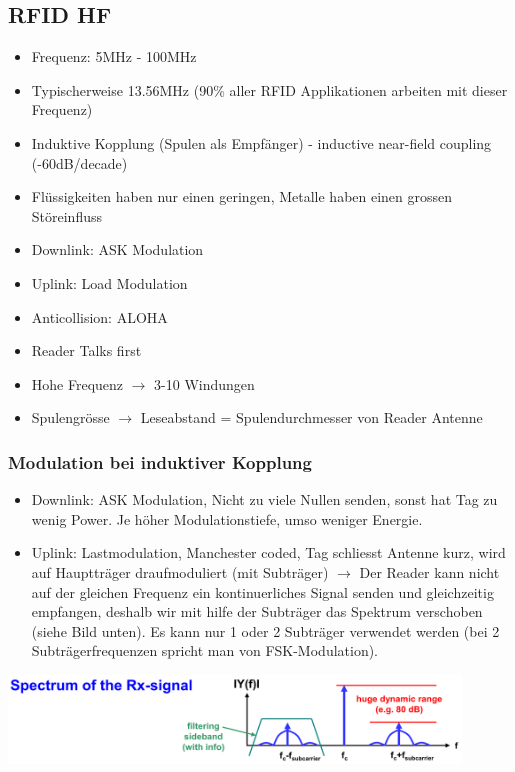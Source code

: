 \subsection{RFID HF}
	\begin{itemize}
		\item Frequenz: 5MHz - 100MHz
		\item Typischerweise 13.56MHz (90\% aller RFID Applikationen arbeiten mit dieser Frequenz)
		\item Induktive Kopplung (Spulen als Empfänger) - inductive near-field coupling (-60dB/decade)
		\item Flüssigkeiten haben nur einen geringen, Metalle haben einen grossen Störeinfluss
		\item Downlink: ASK Modulation
		\item Uplink: Load Modulation
		\item Anticollision: ALOHA
		\item Reader Talks first
		\item Hohe Frequenz $\rightarrow$ 3-10 Windungen
		\item Spulengrösse $\rightarrow$ Leseabstand = Spulendurchmesser von Reader Antenne
	\end{itemize}
\subsubsection{Modulation bei induktiver Kopplung}
	\begin{itemize}
		\item Downlink: ASK Modulation, Nicht zu viele Nullen senden, sonst hat Tag zu wenig Power. Je höher Modulationstiefe, umso weniger Energie. 
		\item Uplink: Lastmodulation, Manchester coded, Tag schliesst Antenne kurz, wird auf Hauptträger draufmoduliert (mit Subträger) $\rightarrow$
		Der Reader kann nicht auf der gleichen Frequenz ein kontinuerliches Signal senden und gleichzeitig empfangen, deshalb wir mit hilfe der Subträger
		das Spektrum verschoben (siehe Bild unten). Es kann nur 1 oder 2 Subträger verwendet werden (bei 2 Subträgerfrequenzen spricht man von FSK-Modulation).
	\end{itemize}
	
	\begin{minipage}{12cm}
		\begin{center}
			\includegraphics[width=12cm]{./bilder/rfid-spectrum.png} 
		\end{center}
	\end{minipage}
	
